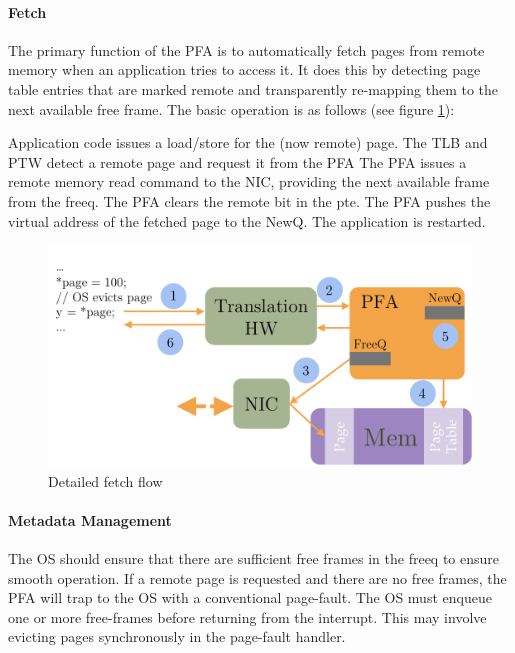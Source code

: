 \paragraph{Fetch}
The primary function of the PFA is to automatically fetch pages from remote
memory when an application tries to access it. It does this by detecting page
table entries that are marked remote and transparently re-mapping them to the
next available free frame. The basic operation is as follows (see figure
\ref{fig:fetch_detail}):

\begin{outline}[enumerate]
    \1 Application code issues a load/store for the (now remote) page.
    \1 The TLB and PTW detect a remote page and request it from the PFA
    \1 The PFA issues a remote memory read command to the NIC, providing the
    next available frame from the \gls{freeq}.
    \1 The PFA clears the remote bit in the \gls{pte}.
    \1 The PFA pushes the virtual address of the fetched page to the NewQ.
    \1 The application is restarted.
\end{outline}

\begin{figure}[h] \centering
  \includegraphics[width=0.8\columnwidth]{figs/pfa_fetch_detail.pdf}
  \caption{Detailed fetch flow}
  \label{fig:fetch_detail}
\end{figure}
\FloatBarrier

\paragraph{Metadata Management}
The OS should ensure that there are sufficient free frames in the \gls{freeq} to
ensure smooth operation. If a remote page is requested and there are no free
frames, the PFA will trap to the OS with a conventional page-fault. The OS must
enqueue one or more free-frames before returning from the interrupt. This may
involve evicting pages synchronously in the page-fault handler.


